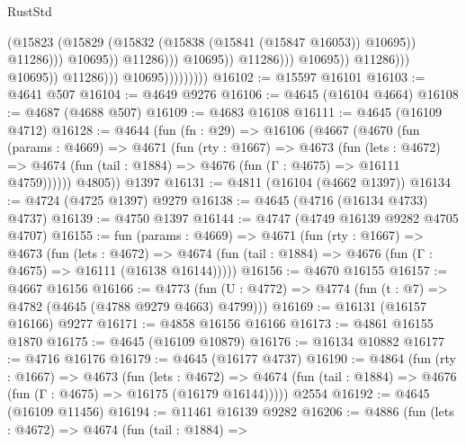 \begin{lexlean}{RustStd}
\begin{coremodule}
                                                                (@15823
                                                                  (@15829
                                                                    (@15832
                                                                      (@15838
                                                                        (@15841 (@15847 @16053))
                                                                        @10695))
                                                                    @11286)))
                                                              @10695))
                                                          @11286)))
                                                    @10695))
                                                @11286)))
                                          @10695))
                                      @11286)))
                                @10695))
                            @11286)))
                      @10695)))))))))
@16102 := @15597 @16101
@16103 := @4641 @507
@16104 := @4649 @9276
@16106 := @4645 (@16104 @4664)
@16108 := @4687 (@4688 @507)
@16109 := @4683 @16108
@16111 := @4645 (@16109 @4712)
@16128 := @4644
    (fun (fn : @29) =>
    @16106
      (@4667
        (@4670
          (fun (params : @4669) =>
          @4671
            (fun (rty : @1667) =>
            @4673
              (fun (lets : @4672) =>
              @4674 (fun (tail : @1884) => @4676 (fun (Γ : @4675) => @16111 @4759))))))
        @4805))
    @1397
@16131 := @4811 (@16104 (@4662 @1397))
@16134 := @4724 (@4725 @1397) @9279
@16138 := @4645 (@4716 (@16134 @4733) @4737)
@16139 := @4750 @1397
@16144 := @4747 (@4749 @16139 @9282 @4705 @4707)
@16155 := fun (params : @4669) =>
  @4671
    (fun (rty : @1667) =>
    @4673
      (fun (lets : @4672) =>
      @4674 (fun (tail : @1884) => @4676 (fun (Γ : @4675) => @16111 (@16138 @16144)))))
@16156 := @4670 @16155
@16157 := @4667 @16156
@16166 := @4773 (fun (U : @4772) => @4774 (fun (t : @7) => @4782 (@4645 (@4788 @9279 @4663) @4799)))
@16169 := @16131 (@16157 @16166) @9277
@16171 := @4858 @16156 @16166
@16173 := @4861 @16155 @1870
@16175 := @4645 (@16109 @10879)
@16176 := @16134 @10882
@16177 := @4716 @16176
@16179 := @4645 (@16177 @4737)
@16190 := @4864
    (fun (rty : @1667) =>
    @4673
      (fun (lets : @4672) =>
      @4674 (fun (tail : @1884) => @4676 (fun (Γ : @4675) => @16175 (@16179 @16144)))))
    @2554
@16192 := @4645 (@16109 @11456)
@16194 := @11461 @16139 @9282
@16206 := @4886
    (fun (lets : @4672) =>
    @4674
      (fun (tail : @1884) =>

\end{coremodule}
\end{lexlean}
